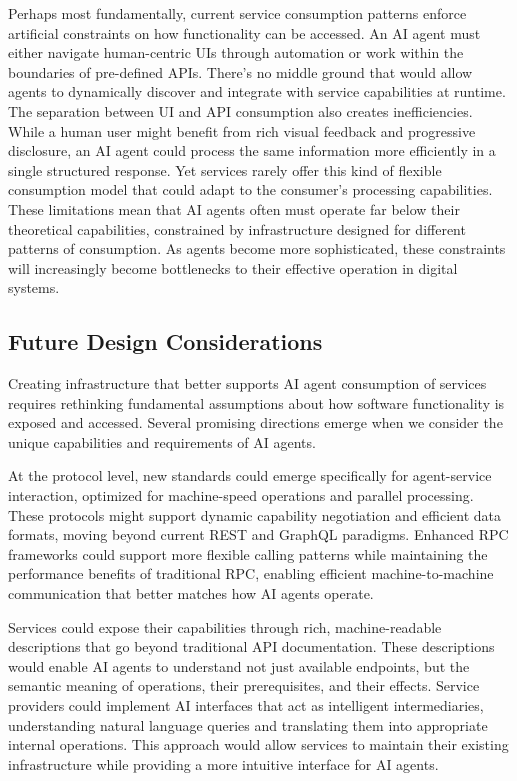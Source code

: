 \documentclass{article}
\begin{document}
Perhaps most fundamentally, current service consumption patterns enforce artificial constraints on how functionality can be accessed. An AI agent must either navigate human-centric UIs through automation or work within the boundaries of pre-defined APIs. There's no middle ground that would allow agents to dynamically discover and integrate with service capabilities at runtime.
The separation between UI and API consumption also creates inefficiencies. While a human user might benefit from rich visual feedback and progressive disclosure, an AI agent could process the same information more efficiently in a single structured response. Yet services rarely offer this kind of flexible consumption model that could adapt to the consumer's processing capabilities.
These limitations mean that AI agents often must operate far below their theoretical capabilities, constrained by infrastructure designed for different patterns of consumption. As agents become more sophisticated, these constraints will increasingly become bottlenecks to their effective operation in digital systems.


\subsection{Future Design Considerations}
\label{subsec:interfaces_future}
Creating infrastructure that better supports AI agent consumption of services requires rethinking fundamental assumptions about how software functionality is exposed and accessed. Several promising directions emerge when we consider the unique capabilities and requirements of AI agents.

At the protocol level, new standards could emerge specifically for agent-service interaction, optimized for machine-speed operations and parallel processing. These protocols might support dynamic capability negotiation and efficient data formats, moving beyond current REST and GraphQL paradigms. Enhanced RPC frameworks could support more flexible calling patterns while maintaining the performance benefits of traditional RPC, enabling efficient machine-to-machine communication that better matches how AI agents operate.

Services could expose their capabilities through rich, machine-readable descriptions that go beyond traditional API documentation. These descriptions would enable AI agents to understand not just available endpoints, but the semantic meaning of operations, their prerequisites, and their effects. Service providers could implement AI interfaces that act as intelligent intermediaries, understanding natural language queries and translating them into appropriate internal operations. This approach would allow services to maintain their existing infrastructure while providing a more intuitive interface for AI agents.
\end{document}
